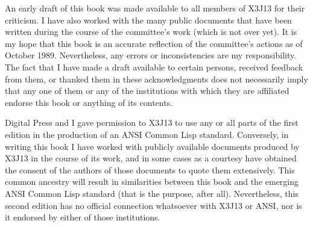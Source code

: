 An early draft of this book was made available to all members
of X3J13 for their criticism.  I have also worked with
the many public documents that have been written during the course
of the committee's work (which is not over yet).
It is my hope that this book is an accurate reflection of the
committee's actions as of October 1989.
Nevertheless, any errors or inconsistencies are my responsibility.
The fact that I have made a draft available to certain persons,
received feedback from them, or thanked them in these
acknowledgments does not necessarily imply that any one of them
or any of the institutions with which they are affiliated endorse this book
or anything of its contents.

Digital Press and I gave permission to X3J13 to use any or all parts
of the first edition in the production of an ANSI Common Lisp standard.
Conversely, in writing this book I have worked with publicly available
documents produced by X3J13 in the course of its work, and in some cases
as a courtesy have obtained the consent of the authors of those documents
to quote them extensively.  This common ancestry will result in similarities
between this book and the emerging ANSI Common Lisp standard (that is the
purpose, after all).  Nevertheless, this second edition 
has no official connection whatsoever
with X3J13 or ANSI, nor is it endorsed by either of those institutions.

